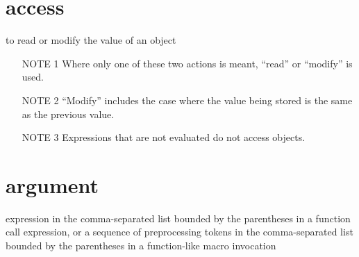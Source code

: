 %
%
%
%
\section{access}
to read or modify the value of an object
\begin{itemize}
\item[NOTE 1] Where only one of these two actions is meant, ``read'' or ``modify'' is used.
\item[NOTE 2] ``Modify'' includes the case where the value being stored is the same as the previous value.
\item[NOTE 3] Expressions that are not evaluated do not access objects.
\end{itemize}
\section{argument}
expression in the comma-separated list bounded by the parentheses in a function call expression, or a sequence of preprocessing tokens in the comma-separated list bounded by the parentheses in a function-like macro invocation
